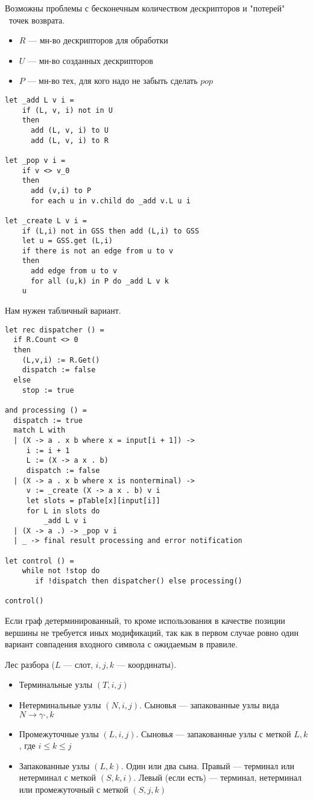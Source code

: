 \documentclass[12pt]{article}  %
\theoremstyle{definition}
\theoremstyle{remark}
\begin{document}
Возможны проблемы с бесконечным количеством дескрипторов и "потерей" \ точек возврата.

\begin{itemize}
\item $R$ --- мн-во дескрипторов для обработки
\item $U$ --- мн-во созданных дескрипторов
\item $P$ --- мн-во тех, для кого надо не забыть сделать $pop$
\end{itemize}

\begin{verbatim}
let _add L v i = 
    if (L, v, i) not in U 
    then 
      add (L, v, i) to U
      add (L, v, i) to R

let _pop v i =
    if v <> v_0
    then
      add (v,i) to P
      for each u in v.child do _add v.L u i

let _create L v i =
    if (L,i) not in GSS then add (L,i) to GSS
    let u = GSS.get (L,i)
    if there is not an edge from u to v
    then
      add edge from u to v
      for all (u,k) in P do _add L v k
    u
\end{verbatim}

Нам нужен табличный вариант.


\begin{verbatim}
let rec dispatcher () = 
  if R.Count <> 0 
  then 
    (L,v,i) := R.Get() 
    dispatch := false 
  else 
    stop := true 

and processing () =  
  dispatch := true 
  match L with
  | (X -> a . x b where x = input[i + 1]) ->
     i := i + 1
     L := (X -> a x . b)
     dispatch := false 
  | (X -> a . x b where x is nonterminal) ->
     v := _create (X -> a x . b) v i
     let slots = pTable[x][input[i]]  
     for L in slots do             
         _add L v i
  | (X -> a .) -> _pop v i
  | _ -> final result processing and error notification

let control () = 
    while not !stop do 
       if !dispatch then dispatcher() else processing() 

control() 

\end{verbatim}


Если граф детерминированный, то кроме использования в качестве позиции вершины не требуется иных модификаций, так как в первом случае ровно один вариант совпадения входного символа с ожидаемым в правиле.


Лес разбора ($L$ --- слот, $i,j,k$ --- координаты).
\begin{itemize}
\item Терминальные узлы $(T,i,j)$
\item Нетерминальные узлы $(N,i,j)$. Сыновья --- запакованные узлы вида $N \rightarrow \gamma \cdot , k$
\item Промежуточные узлы $(L,i,j)$. Сыновья --- запакованные узлы с меткой $L, k$, где $ i \leq k \leq j$ 
\item Запакованные узлы $(L,k)$. Один или два сына. Правый --- терминал или нетерминал с меткой $(S,k,i)$. Левый (если есть) --- терминал, нетерминал или промежуточный с меткой $(S, j, k)$ 
\end{itemize}
\end{document}

